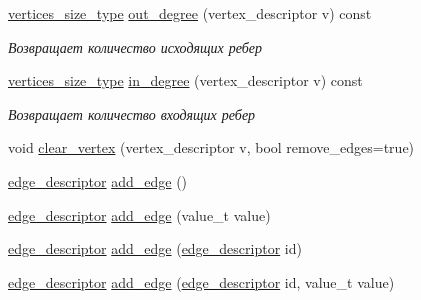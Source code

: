 \begin{DoxyCompactItemize}
\mbox{\label{class_s_p_u___g_r_a_p_h_1_1_spu_ultra_graph_af5dfc7cb77da61beb1d30bfdd4658a92}} 
\hyperlink{class_s_p_u___g_r_a_p_h_1_1_spu_ultra_graph_af8312efee580452b40e3750d8acf3b08}{vertices\+\_\+size\+\_\+type} \hyperlink{class_s_p_u___g_r_a_p_h_1_1_spu_ultra_graph_af5dfc7cb77da61beb1d30bfdd4658a92}{out\+\_\+degree} (vertex\+\_\+descriptor v) const
\begin{DoxyCompactList}\small\item\em Возвращает количество исходящих ребер \end{DoxyCompactList}\item 
\mbox{\label{class_s_p_u___g_r_a_p_h_1_1_spu_ultra_graph_a46cab7fb9993e412b5147a7c9e120273}} 
\hyperlink{class_s_p_u___g_r_a_p_h_1_1_spu_ultra_graph_af8312efee580452b40e3750d8acf3b08}{vertices\+\_\+size\+\_\+type} \hyperlink{class_s_p_u___g_r_a_p_h_1_1_spu_ultra_graph_a46cab7fb9993e412b5147a7c9e120273}{in\+\_\+degree} (vertex\+\_\+descriptor v) const
\begin{DoxyCompactList}\small\item\em Возвращает количество входящих ребер \end{DoxyCompactList}\item 
void \hyperlink{class_s_p_u___g_r_a_p_h_1_1_spu_ultra_graph_adf0f5b7b79b93ef295c39a615b51c71a}{clear\+\_\+vertex} (vertex\+\_\+descriptor v, bool remove\+\_\+edges=true)
\item 
\hyperlink{class_s_p_u___g_r_a_p_h_1_1_spu_ultra_graph_a5f3776e003ef0a1648f1d9f84289810b}{edge\+\_\+descriptor} \hyperlink{class_s_p_u___g_r_a_p_h_1_1_spu_ultra_graph_a5d1dccd777a9686e72b775ebc3151936}{add\+\_\+edge} ()
\item 
\hyperlink{class_s_p_u___g_r_a_p_h_1_1_spu_ultra_graph_a5f3776e003ef0a1648f1d9f84289810b}{edge\+\_\+descriptor} \hyperlink{class_s_p_u___g_r_a_p_h_1_1_spu_ultra_graph_a92ccccf0d18bd2dd146b605ae32a5ae1}{add\+\_\+edge} (value\+\_\+t value)
\item 
\hyperlink{class_s_p_u___g_r_a_p_h_1_1_spu_ultra_graph_a5f3776e003ef0a1648f1d9f84289810b}{edge\+\_\+descriptor} \hyperlink{class_s_p_u___g_r_a_p_h_1_1_spu_ultra_graph_a74ca9423994b1dc3804d5fe62bb1a097}{add\+\_\+edge} (\hyperlink{class_s_p_u___g_r_a_p_h_1_1_spu_ultra_graph_a5f3776e003ef0a1648f1d9f84289810b}{edge\+\_\+descriptor} id)
\item 
\hyperlink{class_s_p_u___g_r_a_p_h_1_1_spu_ultra_graph_a5f3776e003ef0a1648f1d9f84289810b}{edge\+\_\+descriptor} \hyperlink{class_s_p_u___g_r_a_p_h_1_1_spu_ultra_graph_a8a869529155dcb1e380f8fb3a16720ee}{add\+\_\+edge} (\hyperlink{class_s_p_u___g_r_a_p_h_1_1_spu_ultra_graph_a5f3776e003ef0a1648f1d9f84289810b}{edge\+\_\+descriptor} id, value\+\_\+t value)

\end{DoxyCompactItemize}
